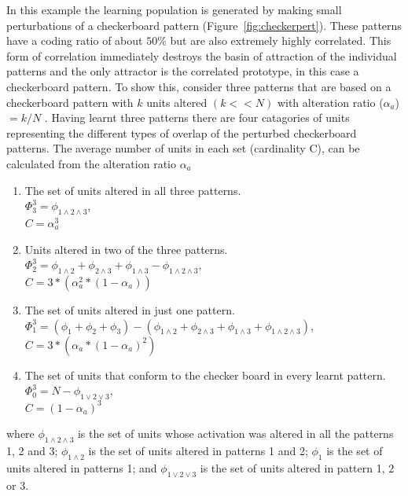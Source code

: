 In this example the learning population is generated by making small perturbations of a checkerboard pattern (Figure~\ref{fig:checkerpert}).  These patterns have a coding ratio of about $50\%$ but are also extremely highly correlated.  This form of correlation immediately destroys the basin of attraction of the individual patterns and the only attractor is the correlated prototype, in this case a checkerboard pattern.  To show this, consider three patterns that are based on a checkerboard pattern with $k$ units altered $(k<<N)$ with alteration ratio ($\alpha_{a}$) $= k/N$ .  Having learnt three patterns there are four catagories of units representing the different types of overlap of the perturbed checkerboard patterns.  The average number of units in each set (cardinality C), can be calculated from the alteration ratio $\alpha_{a}$
\begin{enumerate}
\item The set of units altered in all three patterns. \\
  \hspace{1cm}$\Phi^{3}_{3}=\phi_{1\wedge2\wedge3}$, \\
  \hspace{1cm}$C = \alpha_{a}^3$
\item Units altered in two of the three patterns. \\
  \hspace{1cm}$\Phi^{3}_{2}=\phi_{1\wedge2}+\phi_{2\wedge3}+\phi_{1\wedge3} -
  \phi_{1\wedge2\wedge3}$, \\ 
  \hspace{1cm}$C = 3*(\alpha_{a}^2*(1-\alpha_{a}))$
\item The set of units altered in just one pattern. \\
  \hspace{1cm}$\Phi^{3}_{1}=(\phi_{1} +\phi_{2} + \phi_{3})   
  -(\phi_{1\wedge2}+\phi_{2\wedge3}+\phi_{1\wedge3}+\phi_{1\wedge2\wedge3})$, \\
  \hspace{1cm}$C = 3*(\alpha_{a}*(1-\alpha_{a})^2)$
\item The set of units that conform to the checker board in every learnt pattern.\\
  \hspace{1cm}$\Phi^{3}_{0}=N-\phi_{1\vee 2\vee 3}$, \\
  \hspace{1cm}$C = (1-\alpha_{a})^3$
\end{enumerate}
where $\phi_{1\wedge2\wedge3}$ is the set of units whose activation was altered in all the patterns 1, 2 and 3;
 $\phi_{1\wedge2}$ is the set of units altered in patterns 1 and 2;
 $\phi_{1}$ is the set of units altered in patterns 1; and
 $\phi_{1\vee2\vee3}$ is the set of units altered in pattern 1, 2 or 3.

